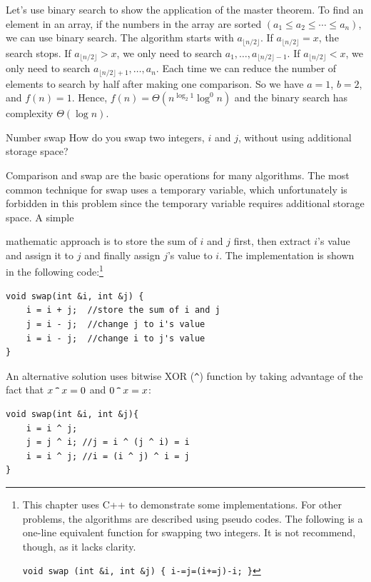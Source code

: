 Let's use binary search to show the application of the master theorem. To find an
element in an array, if the numbers in the array are sorted
$(a_1\leq a_2\leq\cdots\leq a_n)$, we can use binary search. The algorithm starts with
$a_{\lfloor n/2\rfloor}$. If $a_{\lfloor n/2\rfloor}=x$, the search stops. If
$a_{\lfloor n/2\rfloor}>x$, we only need to search
$a_1,\ldots,a_{\lfloor n/2\rfloor-1}$. If $a_{\lfloor n/2\rfloor}<x$, we only need to
search $a_{\lfloor n/2\rfloor+1},\ldots,a_n$. Each time we can reduce the number of
elements to search by half after making one comparison. So we have $a=1$, $b=2$, and
$f(n)=1$. Hence, $f(n)=\Theta(n^{\log_2 1}\log^0 n)$ and the binary search has
complexity $\Theta(\log n)$.

\begin{problem}{Number swap}
How do you swap two integers, $i$ and $j$, without using additional storage space?
\end{problem}

\begin{solution}
Comparison and swap are the basic operations for many algorithms. The most common
technique for swap uses a temporary variable, which unfortunately is forbidden in this
problem since the temporary variable requires additional storage space. A simple


mathematic approach is to store the sum of $i$ and $j$ first, then extract $i$'s value and assign
it to $j$ and finally assign $j$'s value to $i$. The implementation is shown in the following
code:\footnote[2]{This chapter uses C++ to demonstrate some implementations. For other problems, the algorithms are
described using pseudo codes. The following is a one-line equivalent function for swapping two integers. It is not
recommend, though, as it lacks clarity.

\texttt{void swap (int \&i, int \&j) \{ i-=j=(i+=j)-i; \}}}

\begin{verbatim}
void swap(int &i, int &j) {
    i = i + j;  //store the sum of i and j
    j = i - j;  //change j to i's value
    i = i - j;  //change i to j's value
}
\end{verbatim}

An alternative solution uses bitwise XOR (\texttt{\string^}) function by taking advantage of the fact
that $x\,\texttt{\string^}\,x=0$ and $0\,\texttt{\string^}\,x=x$:

\begin{verbatim}
void swap(int &i, int &j){
    i = i ^ j;
    j = j ^ i; //j = i ^ (j ^ i) = i
    i = i ^ j; //i = (i ^ j) ^ i = j
}
\end{verbatim}

\end{solution}

